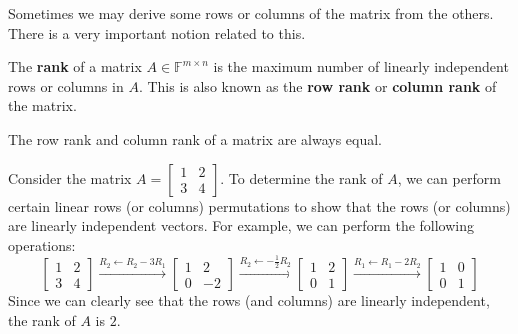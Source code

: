 \documentclass[../lecture-notes-148x210.tex]{subfiles}
\begin{document}
Sometimes we may derive some rows or columns of the matrix from the others. There is a very important notion related to this.

\begin{definition}
    The \textbf{rank} of a matrix $A \in \mathbb{F}^{m \times n}$ is the maximum number of linearly independent rows or columns in $A$. This is also known as the \textbf{row rank} or \textbf{column rank} of the matrix.
\end{definition}

\begin{remark}
    The row rank and column rank of a matrix are always equal.
\end{remark}

\begin{example}
    Consider the matrix $A = \begin{bmatrix} 1 & 2 \\ 3 & 4 \end{bmatrix}$. To
    determine the rank of $A$, we can perform certain linear rows (or columns)
    permutations to show that the rows (or columns) are linearly independent
    vectors. For example, we can perform the following operations:
    \begin{equation*}
        \begin{bmatrix} 
            1 & 2 \\ 
            3 & 4 
        \end{bmatrix} 
        \xrightarrow{R_2 \gets R_2 - 3R_1} 
        \begin{bmatrix} 
            1 & 2 \\ 
            0 & -2 
        \end{bmatrix} 
        \xrightarrow{R_2 \gets - \frac{1}{2}R_2} 
        \begin{bmatrix} 
            1 & 2 \\ 
            0 & 1 
        \end{bmatrix} 
        \xrightarrow{R_1 \gets R_1 - 2R_2} 
        \begin{bmatrix}
            1 & 0 \\
            0 & 1 
        \end{bmatrix}
    \end{equation*}
    Since we can clearly see that the rows (and columns) are linearly independent, the rank of $A$ is $2$.
\end{example}
\end{document}
